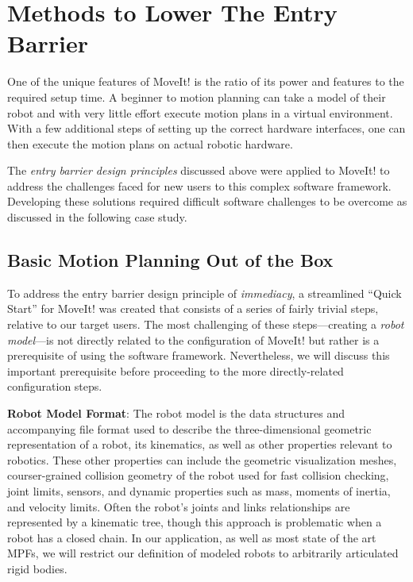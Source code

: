 \documentclass[10pt,journal,compsoc]{joser1}
\begin{document}
{%
\section{Methods to Lower The Entry Barrier}
\label{sec::lowering_barriers}

One of the unique features of MoveIt! is the ratio of its power and features to
the required setup time. A beginner to motion planning can take a model of their
robot and with very little effort execute motion plans in a virtual environment.
With a few additional steps of setting up the correct hardware interfaces, one
can then execute the motion plans on actual robotic hardware.

The \textit{entry barrier design principles} discussed above were applied to
MoveIt! to address the challenges faced for new users to this complex software
framework. Developing these solutions required difficult software challenges to
be overcome as discussed in the following case study.

\subsection{Basic Motion Planning Out of the Box}

To address the entry barrier design principle of \textit{immediacy}, a
streamlined ``Quick Start'' for MoveIt! was created that consists of a series of
fairly trivial steps, relative to our target users. The most challenging of
these steps---creating a \textit{robot model}---is not directly related to the
configuration of MoveIt! but rather is a prerequisite of using the software
framework. Nevertheless, we will discuss this important prerequisite before
proceeding to the more directly-related configuration steps.

{\bf Robot Model Format}: The robot model is the data structures and
accompanying file format used to describe the three-dimensional geometric
representation of a robot, its kinematics, as well as other properties relevant
to robotics. These other properties can include the geometric visualization
meshes, courser-grained collision geometry of the robot used for fast collision
checking, joint limits, sensors, and dynamic properties such as mass, moments of
inertia, and velocity limits. Often the robot's joints and links relationships
are represented by a kinematic tree, though this approach is problematic when a
robot has a closed chain. In our application, as well as most state of the art
MPFs, we will restrict our definition of modeled robots to arbitrarily
articulated rigid bodies. 

}
\end{document}
